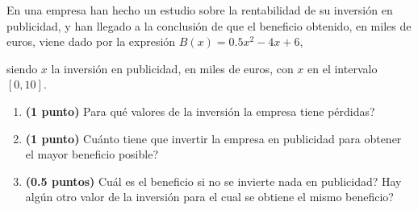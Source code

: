 
En una empresa han hecho un estudio sobre la rentabilidad de su inversión en publicidad, y han llegado a la conclusión de que el beneficio obtenido, en miles de euros, viene dado por la expresión $B(x)=0.5x^2-4x+6$,

siendo $x$ la inversión en publicidad, en miles de euros, con $x$ en el intervalo $[0,10]$.
\begin{enumerate}[label=\alph*)]
\item \textbf{(1 punto)} \textquestiondown{}Para qué valores de la inversión la empresa tiene pérdidas?
\item \textbf{(1 punto)} \textquestiondown{}Cuánto tiene que invertir la empresa en publicidad para obtener el mayor beneficio posible?
\item \textbf{(0.5 puntos)} \textquestiondown{}Cuál es el beneficio si no se invierte nada en publicidad? \textquestiondown{}Hay algún otro valor de la inversión para el cual se obtiene el mismo beneficio?
\end{enumerate}
